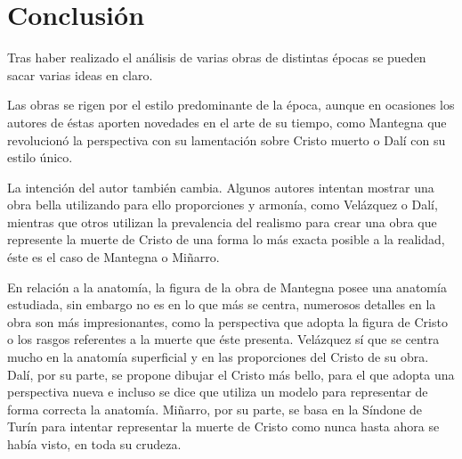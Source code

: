\section{Conclusión}
Tras haber realizado el análisis de varias obras de distintas épocas se pueden sacar varias ideas en claro.

Las obras se rigen por el estilo predominante de la época, aunque en ocasiones los autores de éstas aporten novedades en el arte de su tiempo, como Mantegna que revolucionó la perspectiva con su lamentación sobre Cristo muerto o Dalí con su estilo único.

La intención del autor también cambia. Algunos autores intentan mostrar una obra bella utilizando para ello proporciones y armonía, como Velázquez o Dalí, mientras que otros utilizan la prevalencia del realismo para crear una obra que represente la muerte de Cristo de una forma lo más exacta posible a la realidad, éste es el caso de Mantegna o Miñarro.

En relación a la anatomía, %
la figura de la obra de Mantegna posee una anatomía estudiada, sin embargo no es en lo que más se centra, numerosos detalles en la obra son más impresionantes, como la perspectiva que adopta la figura de Cristo o los rasgos referentes a la muerte que éste presenta. Velázquez sí que se centra mucho en la anatomía superficial y en las proporciones del Cristo de su obra. Dalí, por su parte, se propone dibujar el Cristo más bello, para el que adopta una perspectiva nueva e incluso se dice que utiliza un modelo para representar de forma correcta la anatomía. Miñarro, por su parte, se basa en la Síndone de Turín para intentar representar la muerte de Cristo como nunca hasta ahora se había visto, en toda su crudeza.


